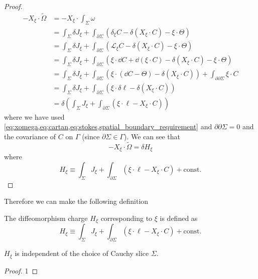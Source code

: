 \documentclass[10pt]{article}
\begin{document}
\begin{proof}
\begin{equation}
\begin{split}
            -X_\xi\cdot\widetilde{\Omega}&=-X_\xi\cdot\int_\Sigma \omega\\
                                     &=\int_{\Sigma}\delta J_\xi+\int_{\partial\Sigma}(\delta_\xi C-\delta(X_\xi\cdot C)-\xi\cdot\Theta)\\
                                     &=\int_{\Sigma}\delta J_\xi+\int_{\partial\Sigma}(\mathcal{L}_\xi C-\delta(X_\xi\cdot C)-\xi\cdot\Theta)\\
                                     &=\int_{\Sigma}\delta J_\xi+\int_{\partial\Sigma}(\xi\cdot\dd{C}+\dd{(\xi\cdot C)}-\delta(X_\xi\cdot C)-\xi\cdot\Theta)\\
                                     &=\int_{\Sigma}\delta J_\xi+\int_{\partial\Sigma}(\xi\cdot(\dd{C}-\Theta)-\delta(X_\xi\cdot C))+\int_{\partial\partial\Sigma}\xi\cdot C\\
                                     &=\int_{\Sigma}\delta J_\xi+\int_{\partial\Sigma}(\xi\cdot\delta\ell-\delta(X_\xi\cdot C))\\
                                     &=\delta\left(\int_\Sigma J_\xi+\int_{\partial\Sigma}(\xi\cdot\ell-X_\xi\cdot C)\right)
        \end{split}
    \end{equation}
    where we have used \cref{eq:xomega,eq:cartan,eq:stokes,spatial_boundary_requirement} and $\partial\partial\Sigma=0$ and the covariance of $C$ on $\Gamma$ (since $\partial \Sigma\in\Gamma$). 
    We can see that
    \begin{equation}
        -X_\xi\cdot\widetilde{\Omega}=\delta H_\xi
    \end{equation}
    where
    \begin{equation}
        H_\xi\equiv\int_{\Sigma}J_{\xi}+\int_{\partial\Sigma}(\xi\cdot\ell-X_\xi\cdot C)+\text{const.}
    \end{equation}

\end{proof}
Therefore we can make the following definition
\begin{definition}
    The diffeomorphism charge $H_\xi$ corresponding to $\xi$ is defined as 
    \begin{equation}
        H_\xi\equiv\int_{\Sigma}J_{\xi}+\int_{\partial\Sigma}(\xi\cdot\ell-X_\xi\cdot C)+\text{const.}
    \end{equation}
\end{definition}

\begin{claim}
    $H_\xi$ is independent of the choice of Cauchy slice $\Sigma$.
\end{claim}
\begin{proof}
    1
\end{proof}
\end{document}

